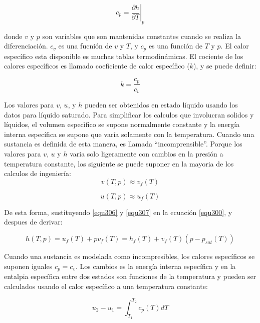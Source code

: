 \documentclass[12pt]{book}
\theoremstyle{definition}
\theoremstyle{remark}
\theoremstyle{plain}
\begin{document}
\begin{equation}
 \label{equ304}
c_p = \left . \frac{\partial h}{\partial T} \right|_p
\end{equation}

donde $v$ y $p$ son variables que son mantenidas constantes cuando se realiza la 
diferenciación. $c_v$ es una fucnión de $v$ y $T$, y $c_p$ es una función de $T$ y $p$. El
calor específico esta disponible es muchas tablas termodinámicas. El cociente de los calores 
específicos es llamado coeficiente de calor específico ($k$), y se puede definir:


\begin{equation}
 \label{equ305}
k = \frac{c_p}{c_v}
\end{equation}

Los valores para $v$, $u$, y $h$ pueden ser obtenidos en estado líquido usando los 
datos para líquido saturado. Para simplificar los calculos que involucran solidos
y líquidos, el volumen especìfico se supone normalmente constante y la energía interna 
específica se supone que varía solamente con la temperatura. Cuando una sustancia 
es definida de esta manera, es llamada ``incomprensible''. Porque los valores para 
$v$, $u$ y $h$ varia solo ligeramente con cambios en la presión a temperatura constante,
los siguiente se puede suponer en la mayoria de los calculos de ingeniería:
\begin{equation}
 \label{equ306}
v(T,p) \approx v_f(T)
\end{equation}

\begin{equation}
 \label{equ307}
u(T,p) \approx u_f(T)
\end{equation}

De esta forma, sustituyendo \ref{equ306} y \ref{equ307} en la ecuación \ref{equ300}, y 
despues de derivar:

\begin{equation}
 \label{equ308}
h(T,p)=u_f(T)+p v_f (T)=h_f (T)+ v_f(T)(p-p_{sat}(T))
\end{equation}

Cuando una sustancia es modelada como incompresibles, los calores específicos se suponen
iguales $c_p = c_v$. Los cambios es la energía interna específica y en la entalpia 
específica entre dos estados son funciones de la temperatura y pueden ser calculados usando
el calor específico a una temperatura constante:

\begin{equation}
 \label{equ309}
u_2-u_1= \int_{T_1}^{T_2} c_p(T) dT
\end{equation}
\end{document}
